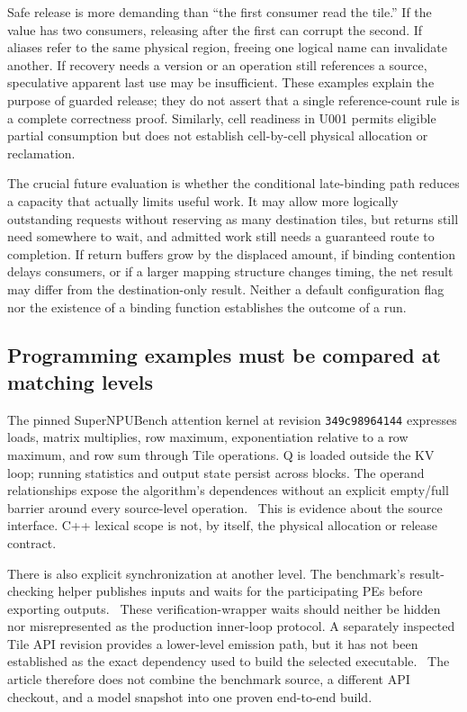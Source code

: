 Safe release is more demanding than ``the first consumer read the tile.'' If the value has two consumers, releasing after the first can corrupt the second. If aliases refer to the same physical region, freeing one logical name can invalidate another. If recovery needs a version or an operation still references a source, speculative apparent last use may be insufficient. These examples explain the purpose of guarded release; they do not assert that a single reference-count rule is a complete correctness proof. Similarly, cell readiness in U001 permits eligible partial consumption but does not establish cell-by-cell physical allocation or reclamation.

The crucial future evaluation is whether the conditional late-binding path reduces a capacity that actually limits useful work. It may allow more logically outstanding requests without reserving as many destination tiles, but returns still need somewhere to wait, and admitted work still needs a guaranteed route to completion. If return buffers grow by the displaced amount, if binding contention delays consumers, or if a larger mapping structure changes timing, the net result may differ from the destination-only result. Neither a default configuration flag nor the existence of a binding function establishes the outcome of a run.

\subsection{Programming examples must be compared at matching levels}

The pinned SuperNPUBench attention kernel at revision \texttt{349c98964144} expresses loads, matrix multiplies, row maximum, exponentiation relative to a row maximum, and row sum through Tile operations. Q is loaded outside the KV loop; running statistics and output state persist across blocks. The operand relationships expose the algorithm's dependences without an explicit empty/full barrier around every source-level operation.~\citep{u002-benchmark-fa} This is evidence about the source interface. C++ lexical scope is not, by itself, the physical allocation or release contract.

There is also explicit synchronization at another level. The benchmark's result-checking helper publishes inputs and waits for the participating PEs before exporting outputs.~\citep{u002-benchmark-wrapper} These verification-wrapper waits should neither be hidden nor misrepresented as the production inner-loop protocol. A separately inspected Tile API revision provides a lower-level emission path, but it has not been established as the exact dependency used to build the selected executable.~\citep{u001-benchmark-audit} The article therefore does not combine the benchmark source, a different API checkout, and a model snapshot into one proven end-to-end build.

